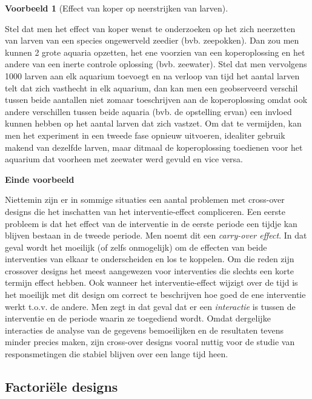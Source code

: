 \documentclass[
  12pt,dutch]{book}
\theoremstyle{definition}
\theoremstyle{definition}
\newtheorem{example}{Voorbeeld}[chapter]
\theoremstyle{definition}
\theoremstyle{definition}
\theoremstyle{remark}
\begin{document}
\begin{example}[Effect van koper op neerstrijken van larven]
\protect\hypertarget{exm:unnamed-chunk-77}{}\label{exm:unnamed-chunk-77}~
\end{example}

Stel dat men het effect van koper wenst te onderzoeken op het zich neerzetten van larven van een species ongewerveld zeedier (bvb. zeepokken). Dan zou men kunnen 2 grote aquaria opzetten, het ene voorzien van een koperoplossing en het andere van een inerte controle oplossing (bvb. zeewater). Stel dat men vervolgens 1000 larven aan elk aquarium toevoegt en na verloop van tijd het aantal larven telt dat zich vasthecht in elk aquarium, dan kan men een geobserveerd verschil tussen beide aantallen niet zomaar toeschrijven aan de koperoplossing omdat ook andere verschillen tussen beide aquaria (bvb. de opstelling ervan) een invloed kunnen hebben op het aantal larven dat zich vastzet. Om dat te vermijden, kan men het experiment in een tweede fase opnieuw uitvoeren, idealiter gebruik makend van dezelfde larven, maar ditmaal de koperoplossing toedienen voor het aquarium dat voorheen met zeewater werd gevuld en vice versa.

\textbf{Einde voorbeeld}

Niettemin zijn er in sommige situaties een aantal problemen met cross-over
designs die het inschatten van het interventie-effect compliceren. Een
eerste probleem is dat het effect van de interventie in de eerste periode
een tijdje kan blijven bestaan in de tweede periode. Men noemt dit een
\emph{carry-over effect}. In dat geval wordt het moeilijk (of zelfs
onmogelijk) om de effecten van beide interventies van elkaar te
onderscheiden en los te koppelen. Om die reden zijn crossover designs het meest aangewezen voor interventies die slechts een korte termijn effect hebben. Ook wanneer het interventie-effect wijzigt over de tijd
is het moeilijk met dit design om correct te beschrijven hoe goed
de ene interventie werkt t.o.v. de andere. Men zegt in dat geval dat er een
\emph{interactie} is tussen de interventie en de periode waarin ze
toegediend wordt. Omdat dergelijke interacties de analyse van de gegevens
bemoeilijken en de resultaten tevens minder precies maken, zijn cross-over
designs vooral nuttig voor de studie van responsmetingen die stabiel
blijven over een lange tijd heen.

\subsection{Factoriële designs}\label{factoriuxeble-designs}
\end{document}
